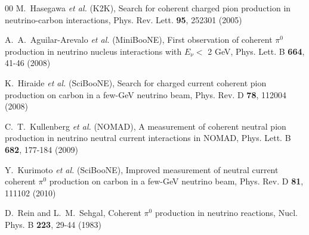 \documentclass[aps,prl,twocolumn,superscriptaddress,nofootinbib]{revtex4-1}
\begin{document}
\begin{thebibliography}{00}
M.~Hasegawa \textit{et al.} (K2K),
Search for coherent charged pion production in neutrino-carbon interactions,
Phys. Rev. Lett. \textbf{95}, 252301 (2005)

A.~A.~Aguilar-Arevalo \textit{et al.} (MiniBooNE),
First observation of coherent $\pi^0$ production in neutrino nucleus interactions with $E_{\nu}<$ 2 GeV,
Phys. Lett. B \textbf{664}, 41-46 (2008)

K.~Hiraide \textit{et al.} (SciBooNE),
Search for charged current coherent pion production on carbon in a few-GeV neutrino beam,
Phys. Rev. D \textbf{78}, 112004 (2008)

C.~T.~Kullenberg \textit{et al.} (NOMAD),
A measurement of coherent neutral pion production in neutrino neutral current interactions in NOMAD,
Phys. Lett. B \textbf{682}, 177-184 (2009)

Y.~Kurimoto \textit{et al.} (SciBooNE),
Improved measurement of neutral current coherent $\pi^0$ production on carbon in a few-GeV neutrino beam,
Phys. Rev. D \textbf{81}, 111102 (2010)

D.~Rein and L.~M.~Sehgal,
Coherent $\pi^{0}$ production in neutrino reactions,
Nucl. Phys. B \textbf{223}, 29-44 (1983)


\end{thebibliography}
\end{document}
